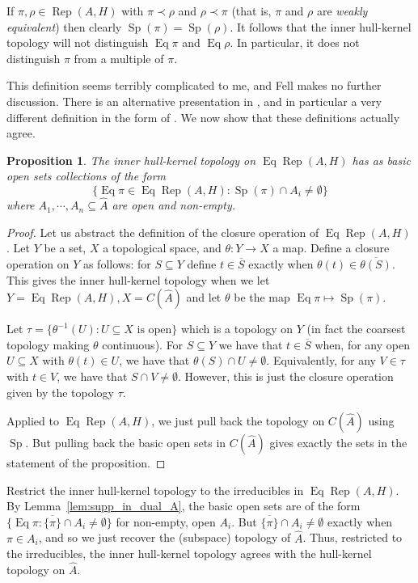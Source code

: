 \documentclass[a4paper,11pt]{article}
\newcommand{\Rep}{\operatorname{Rep}}
\newcommand{\Eq}{\operatorname{Eq}}
\newcommand{\Sp}{\operatorname{Sp}}
\newtheorem{proposition}[lemma]{Proposition}
\begin{document}
If $\pi,\rho\in\Rep(A,H)$ with $\pi\prec\rho$ and $\rho\prec\pi$ (that is,
$\pi$ and $\rho$ are \emph{weakly equivalent}) then clearly $\Sp(\pi)=\Sp(\rho)$.
It follows that the inner hull-kernel topology will not distinguish $\Eq\pi$
and $\Eq\rho$.  In particular, it does not distinguish $\pi$ from a multiple
of $\pi$.

This definition seems terribly complicated to me, and Fell makes no further
discussion.  There is an alternative presentation in \cite[Chapter~5]{kan},
and in particular a very different definition in the form of
\cite[Definition~5.5]{kan}.  We now show that these definitions actually agree.

\begin{proposition}
The inner hull-kernel topology on $\Eq\Rep(A,H)$ has as basic open
sets collections of the form
\[ \{\Eq\pi\in\Eq\Rep(A,H) : \Sp(\pi) \cap A_i\not=\emptyset \} \]
where $A_1,\cdots,A_n\subseteq \hat A$ are open and non-empty.
\end{proposition}
\begin{proof}
Let us abstract the definition of the closure operation of $\Eq\Rep(A,H)$.
Let $Y$ be a set, $X$ a topological space, and $\theta:Y\rightarrow X$ a map.
Define a closure operation on $Y$ as follows: for $S\subseteq Y$ define
$t\in\overline{S}$ exactly when $\theta(t) \in \overline{\theta(S)}$.
This gives the inner hull-kernel topology when we let $Y=\Eq\Rep(A,H), 
X=C(\hat A)$ and let $\theta$ be the map $\Eq\pi \mapsto \Sp(\pi)$.

Let $\tau=\{\theta^{-1}(U) : U\subseteq X \text{ is open}\}$ which is a
topology on $Y$ (in fact the coarsest topology making $\theta$ continuous).
For $S\subseteq Y$ we have that $t\in\overline{S}$ when, for any open $U\subseteq 
X$ with $\theta(t)\in U$, we have that $\theta(S)\cap U\not=\emptyset$.
Equivalently, for any $V\in\tau$ with $t\in V$, we have that $S\cap V\not=
\emptyset$.  However, this is just the closure operation given by the topology
$\tau$.

Applied to $\Eq\Rep(A,H)$, we just pull back the topology on $C(\hat A)$
using $\Sp$.  But pulling back the basic open sets in $C(\hat A)$ gives exactly
the sets in the statement of the proposition.
\end{proof}

Restrict the inner hull-kernel topology to the irreducibles in $\Eq\Rep(A,H)$.
By Lemma~\ref{lem:supp_in_dual_A}, the basic open sets are of the form
$\{\Eq\pi : \overline{\{\pi\}} \cap A_i\not=\emptyset \}$ for non-empty, open
$A_i$.  But $\overline{\{\pi\}} \cap A_i\not=\emptyset$ exactly when $\pi\in A_i$,
and so we just recover the (subspace) topology of $\hat A$.  Thus, restricted
to the irreducibles, the inner hull-kernel topology agrees with the hull-kernel
topology on $\hat A$.
\end{document}
